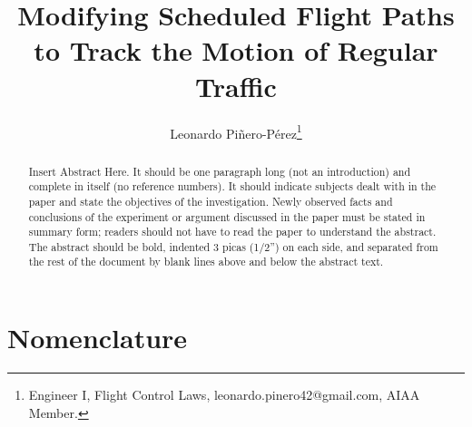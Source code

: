 \documentclass[conf]{new-aiaa}
\title{Modifying Scheduled Flight Paths to Track the Motion of Regular Traffic}
\author{Leonardo Pi{\~{n}}ero-P{\'{e}}rez\footnote{Engineer I, Flight Control Laws, leonardo.pinero42@gmail.com, AIAA Member.}}
\affil{Bell Flight, Arlington, TX, 76019}
\begin{document}
\maketitle

\begin{abstract}
Insert Abstract Here. It should be one paragraph long (not an introduction) and complete in itself (no reference numbers). It should indicate subjects dealt with in the paper and state the objectives of the investigation. Newly observed facts and conclusions of the experiment or argument discussed in the paper must be stated in summary form; readers should not have to read the paper to understand the abstract. The abstract should be bold, indented 3 picas (1/2'') on each side, and separated from the rest of the document by blank lines above and below the abstract text.
\end{abstract}

\section{Nomenclature}
\end{document}
